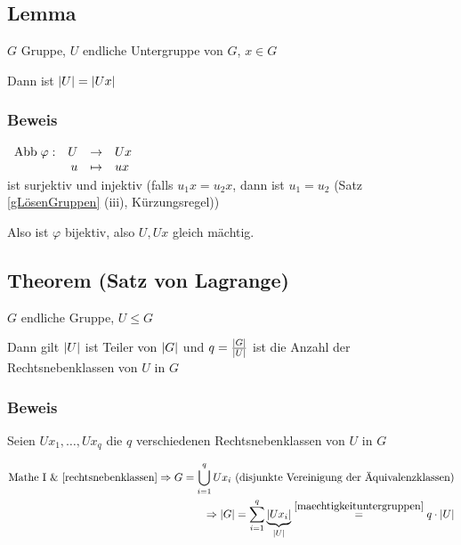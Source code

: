 
\subsection[Lemma: Mächtigkeit von Untergruppen]{Lemma}
\label{maechtigkeituntergruppen}
$G$ Gruppe, $U$ endliche Untergruppe von $G$, $x \in G$

Dann ist $\left|U\right| = \left|Ux\right|$

\subsubsection*{Beweis}

$\begin{array}[b]{rrcl}
\mathrm{ Abb } \; \varphi: 	& U &\to& Ux \\
				& u &\mapsto& ux
\end{array}$
\\ist surjektiv
und injektiv 
(falls $u_1x=u_2x$, dann ist $u_1 = u_2$ (Satz \ref{gLösenGruppen} (iii), Kürzungsregel))

Also ist $\varphi$ bijektiv, also $U, Ux$ gleich mächtig.

\subsection[Theorem: Satz von Lagrange]{Theorem (Satz von Lagrange)} \label{lagrange}

$G$ endliche Gruppe, $U \leqslant G$

Dann gilt $\left|U\right|$ ist Teiler von $\left|G\right|$ und $q = \frac{\left|G\right|}{\left|U\right|}$ ist die Anzahl der Rechtsnebenklassen von $U$ in $G$

\subsubsection*{Beweis}

Seien $Ux_1, \dots, Ux_q$ die $q$ verschiedenen Rechtsnebenklassen von $U$ in $G$

\[\begin{split}
\text{Mathe I \& \ref{rechtsnebenklassen}}\Rightarrow G = \bigcup_{i=1}^{q}Ux_i \text{ (disjunkte Vereinigung der Äquivalenzklassen)}
\\\Rightarrow \left|G\right| = \sum_{i=1}^{q}\underbrace{\left|Ux_i\right|}_{\left|U\right|} \stackrel{\ref{maechtigkeituntergruppen}}{=} q \cdot \left|U\right| \end{split}\]

